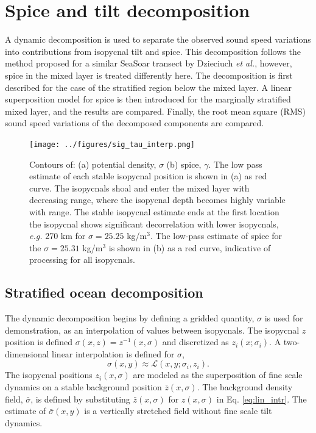 \documentclass[preprint,NumberedRefs]{JASA}
\begin{document}
\section{\label{sec:decomposition}Spice and tilt decomposition}
A dynamic decomposition is used to separate the observed sound speed variations into contributions from isopycnal tilt and spice. This decomposition follows the method proposed for a similar SeaSoar transect by Dzieciuch \emph{et al.},\citep{dzieciuch2004} however, spice in the mixed layer is treated differently here. The decomposition is first described for the case of the stratified region below the mixed layer. A linear superposition model for spice is then introduced for the marginally stratified mixed layer, and the results are compared. Finally, the root mean square (RMS) sound speed variations of the decomposed components are compared.

\begin{figure}
\texttt{[image: ../figures/sig\_tau\_interp.png]}
    \caption{\label{fig:cntrs}{Contours of: (a) potential density, $\sigma$ (b) spice, $\gamma$. The low pass estimate of each stable isopycnal position is shown in (a) as red curve. The isopycnals shoal and enter the mixed layer with decreasing range, where the isopycnal depth becomes highly variable with range. The stable isopycnal estimate ends at the first location the isopycnal shows significant decorrelation with lower isopycnals, \emph{e.g.} 270 km for $\sigma=25.25$ kg/m$^3$. The low-pass estimate of spice for the $\sigma=25.31$ kg/m$^3$ is shown in (b) as a red curve, indicative of processing for all isopycnals.}}
\end{figure}

\subsection{Stratified ocean decomposition}
The dynamic decomposition begins by defining a gridded quantity, $\sigma$ is used for demonstration, as an interpolation of values between isopycnals. The isopycnal $z$ position is defined $\sigma(x, z) = z^{-1}(x, \sigma)$ and discretized as $z_i(x; \sigma_i)$. A two-dimensional linear interpolation is defined for $\sigma$,
\begin{equation}
    \sigma(x,y)\approx\mathcal{L}(x, y; \sigma_i, z_i).
    \label{eq:lin_intr}
\end{equation}
The isopycnal positions $z_i(x, \sigma)$ are modeled as the superposition of fine scale dynamics on a stable background position $\bar{z}(x, \sigma)$. The background density field, $\bar{\sigma}$, is defined by substituting $\bar{z}(x, \sigma)$ for $z(x, \sigma)$ in Eq. \eqref{eq:lin_intr}. The estimate of $\bar{\sigma}(x,y)$ is a vertically stretched field without fine scale tilt dynamics.
\end{document}
